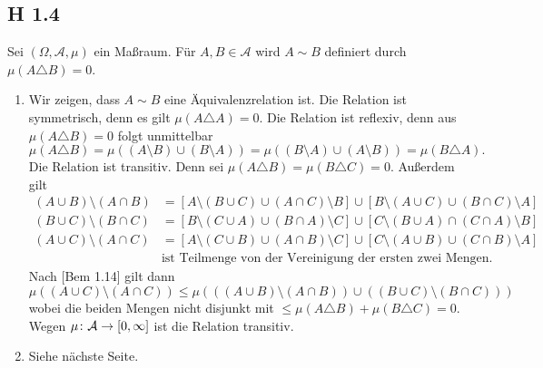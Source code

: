 \documentclass[draft,a5paper]{article}
\theoremstyle{remark}
\begin{document}
\subsection{H 1.4}
Sei \((\Omega, \mathcal{A}, \mu)\) ein Maßraum.  Für \(A, B \in \mathcal{A}\) wird \(A \sim B\) definiert
durch \(\mu(A \triangle B) = 0\).
\begin{enumerate}
\item Wir zeigen, dass \(A \sim B\) eine Äquivalenzrelation ist.  Die
  Relation ist symmetrisch, denn es gilt \(\mu(A \triangle A) = 0\).  Die Relation
  ist reflexiv, denn aus \(\mu(A \triangle B)  = 0\) folgt unmittelbar
  \[\mu(A \triangle B) = \mu((A \setminus B) \cup (B \setminus A)) = \mu((B \setminus A) \cup (A \setminus B)) = \mu(B
    \triangle A).\]
  Die Relation ist transitiv.  Denn sei \(\mu(A \triangle B) = \mu(B \triangle C) = 0\).
  Außerdem gilt
  \begin{align*}
    (A \cup B) \setminus (A \cap B) &= [A \setminus (B \cup C) \cup (A \cap C) \setminus B] \cup [B \setminus (A \cup C) \cup
                        (B \cap C) \setminus A] \\
    (B \cup C) \setminus (B \cap C) &= [B \setminus (C \cup A) \cup (B \cap A) \setminus C] \cup [C\setminus (B \cup A) \cap
                        (C \cap A) \setminus B] \\
    (A \cup C) \setminus (A \cap C) &= [A \setminus (C \cup B) \cup (A \cap B) \setminus C] \cup [C \setminus (A \cup B) \cup
                        (C \cap B) \setminus A] \\
                      &\text{ist Teilmenge von der Vereinigung der ersten zwei Mengen.}
  \end{align*}
  Nach [Bem 1.14] gilt dann \[\mu((A \cup C) \setminus (A \cap C)) \le \mu(((A \cup B) \setminus (A \cap B))
  \cup ((B \cup C) \setminus (B \cap C)))\] wobei die beiden Mengen nicht disjunkt mit
  \(\le \mu(A \triangle B) + \mu(B \triangle C) = 0\).  Wegen \(\mu\colon \mathcal{A} \to \interval{0}{\infty}\) ist die
  Relation transitiv.
\item Siehe nächste Seite.
\end{enumerate}
\end{document}
